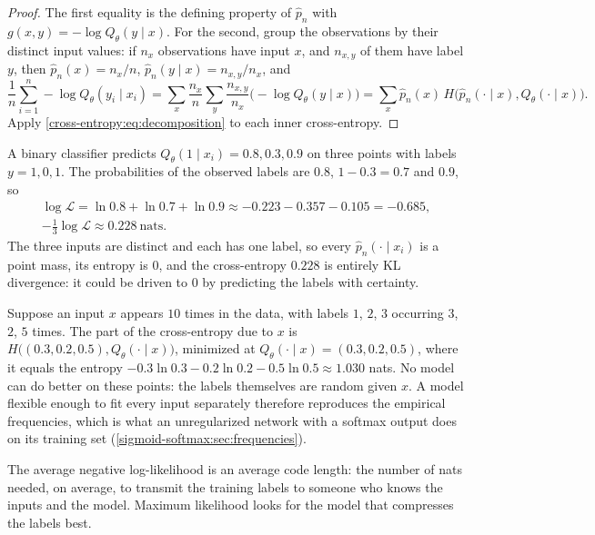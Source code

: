 \begin{notechapter}
\begin{proof}
The first equality is the defining property of $\hat p_n$ with
$g(x,y) = -\log Q_\theta(y\mid x)$. For the second, group the observations by their
distinct input values: if $n_x$ observations have input $x$, and $n_{x,y}$ of them
have label $y$, then $\hat p_n(x) = n_x/n$, $\hat p_n(y\mid x) = n_{x,y}/n_x$, and
\[
  \frac1n\sum_{i=1}^n-\log Q_\theta(y_i\mid x_i) = \sum_x\frac{n_x}n\sum_y\frac{n_{x,y}}{n_x}\bigl(-\log Q_\theta(y\mid x)\bigr)
  = \sum_x\hat p_n(x)\,H\bigl(\hat p_n(\cdot\mid x), Q_\theta(\cdot\mid x)\bigr).
\]
Apply \cref{cross-entropy:eq:decomposition} to each inner cross-entropy.
\end{proof}

\begin{example}\label{cross-entropy:ex:three}
A binary classifier predicts $Q_\theta(1\mid x_i) = 0.8, 0.3, 0.9$ on three points with labels
$y = 1, 0, 1$. The probabilities of the observed labels are $0.8$, $1 - 0.3 = 0.7$ and $0.9$, so
\begin{gather*}
  \log\mathcal L = \ln0.8 + \ln0.7 + \ln0.9\approx-0.223 - 0.357 - 0.105 = -0.685,\\
  -\tfrac13\log\mathcal L\approx0.228\ \text{nats}.
\end{gather*}
The three inputs are distinct and each has one label, so every
$\hat p_n(\cdot\mid x_i)$ is a point mass, its entropy is $0$, and the cross-entropy $0.228$
is entirely KL divergence: it could be driven to $0$ by predicting the labels with
certainty.
\end{example}

\begin{example}\label{cross-entropy:ex:repeated}
Suppose an input $x$ appears $10$ times in the data, with labels $1$, $2$, $3$
occurring $3$, $2$, $5$ times. The part of the cross-entropy due to $x$ is
$H\bigl((0.3,0.2,0.5), Q_\theta(\cdot\mid x)\bigr)$, minimized at
$Q_\theta(\cdot\mid x) = (0.3, 0.2, 0.5)$, where it equals the entropy
$-0.3\ln0.3 - 0.2\ln0.2 - 0.5\ln0.5\approx1.030$ nats. No model can do better on these
points: the labels themselves are random given $x$. A model flexible enough to
fit every input separately therefore reproduces the empirical frequencies,
which is what an unregularized network with a softmax output does on its
training set (\cref{sigmoid-softmax:sec:frequencies}).
\end{example}

\begin{intuition}
The average negative log-likelihood is an average code length: the number of
nats needed, on average, to transmit the training labels to someone who knows
the inputs and the model. Maximum likelihood looks for the model that compresses
the labels best.
\end{intuition}


\end{notechapter}
